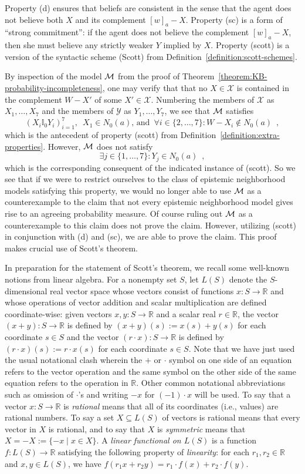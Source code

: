 \documentclass[12pt]{article}
\theoremstyle{definition}
\newcommand{\M}{{\cal M}}      %
\begin{document}
Property (d) ensures that beliefs are consistent in the sense that the
agent does not believe both $X$ and its complement $[w]_a-X$.
Property (sc) is a form of ``strong commitment'': if the agent does
not believe the complement $[w]_a-X$, then she must believe any
strictly weaker $Y$ implied by $X$.  Property (scott) is a version of
the syntactic scheme (Scott) from
Definition~\ref{definition:scott-schemes}.

By inspection of the model $\M$ from the proof of
Theorem~\ref{theorem:KB-probability-incompleteness}, one may verify
that that no $X\in\mathcal{X}$ is contained in the complement $W-X'$
of some $X'\in\mathcal{X}$. Numbering the members of $\mathcal{X}$ as
$X_1,\dots,X_7$ and the members of $\mathcal{Y}$ as $Y_1,\dots,Y_7$,
we see that $\M$ satisfies
\[
(X_i\mathbb{I}_0Y_i)_{i=1}^7,\enspace X_1\in N_0(a)\text{,
  and}\enspace \forall i\in\{2,\dots,7\}:W-X_i\notin N_0(a)\enspace,
\]
which is the antecedent of property (scott) from
Definition~\ref{definition:extra-properties}.  However, $\M$ does not
satisfy
\[
\exists j\in\{1,\dots,7\}:Y_j\in N_0(a)\enspace,
\]
which is the corresponding consequent of the indicated instance of
(scott).  So we see that if we were to restrict ourselves to the class
of epistemic neighborhood models satisfying this property, we would no
longer able to use $\M$ as a counterexample to the claim that not
every epistemic neighborhood model gives rise to an agreeing
probability measure.  Of course ruling out $\M$ as a counterexample to
this claim does not prove the claim.  However, utilizing (scott) in
conjunction with (d) and (sc), we are able to prove the claim.  This
proof makes crucial use of Scott's theorem.

In preparation for the statement of Scott's theorem, we recall some
well-known notions from linear algebra.  For a nonempty set $S$, let
$L(S)$ denote the $S$-dimensional real vector space whose vectors
consist of functions $x:S\to\mathbb{R}$ and whose operations of vector
addition and scalar multiplication are defined coordinate-wise: given
vectors $x,y:S\to\mathbb{R}$ and a scalar real $r\in\mathbb{R}$, the
vector $(x+y):S\to\mathbb{R}$ is defined by $(x+y)(s):=x(s)+y(s)$ for
each coordinate $s\in S$ and the vector $(r\cdot x):S\to\mathbb{R}$ is
defined by $(r\cdot x)(s):=r\cdot x(s)$ for each coordinate $s\in S$.
Note that we have just used the usual notational clash wherein the $+$
or $\cdot$ symbol on one side of an equation refers to the vector
operation and the same symbol on the other side of the same equation
refers to the operation in $\mathbb{R}$. Other common notational
abbreviations such as omission of $\cdot$'s and writing $-x$ for
$(-1)\cdot x$ will be used. To say that a vector $x:S\to\mathbb{R}$ is
\emph{rational} means that all of its coordinates (i.e., values) are
rational numbers.  To say a set $X\subseteq L(S)$ of vectors is
rational means that every vector in $X$ is rational, and to say that
$X$ is \emph{symmetric} means that $X=-X:=\{-x\mid x\in X\}$.  A
\emph{linear functional on $L(S)$} is a function $f:L(S)\to\mathbb{R}$
satisfying the following property of \emph{linearity\/}: for each
$r_1,r_2\in\mathbb{R}$ and $x,y\in L(S)$, we have
$f(r_1x+r_2y)=r_1\cdot f(x)+r_2\cdot f(y)$.
\end{document}
